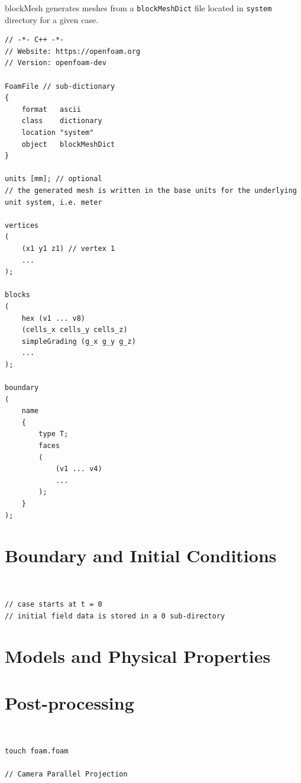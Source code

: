 \documentclass{blog}
\begin{document}
\begin{definition}[blockMesh]
    blockMesh generates meshes from a \verb|blockMeshDict| file
    located in \verb|system| directory for a given case.
    \small
    \begin{verbatim}
// -*- C++ -*-
// Website: https://openfoam.org
// Version: openfoam-dev

FoamFile // sub-dictionary
{
    format   ascii
    class    dictionary
    location "system"
    object   blockMeshDict
}

units [mm]; // optional
// the generated mesh is written in the base units for the underlying unit system, i.e. meter

vertices
(
    (x1 y1 z1) // vertex 1
    ...
);

blocks
(
    hex (v1 ... v8)
    (cells_x cells_y cells_z)
    simpleGrading (g_x g_y g_z)
    ...
);

boundary
(
    name
    {
        type T;
        faces
        (
            (v1 ... v4)
            ...
        );
    }
);
\end{verbatim}
\end{definition}

\section{Boundary and Initial Conditions}
\begin{definition}~
    \begin{verbatim}
// case starts at t = 0
// initial field data is stored in a 0 sub-directory
\end{verbatim}
\end{definition}

\begin{definition}[p]

\end{definition}

\section{Models and Physical Properties}

\section{Post-processing}
\begin{definition}[paraview]~
    \begin{verbatim}
touch foam.foam

// Camera Parallel Projection
\end{verbatim}
\end{definition}
\end{document}

